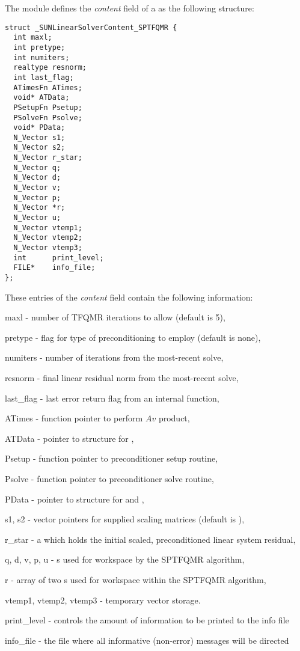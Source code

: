 The {\sunlinsolsptfqmr} module defines the \textit{content} field of a
 as the following structure:
\begin{verbatim}
struct _SUNLinearSolverContent_SPTFQMR {
  int maxl;
  int pretype;
  int numiters;
  realtype resnorm;
  int last_flag;
  ATimesFn ATimes;
  void* ATData;
  PSetupFn Psetup;
  PSolveFn Psolve;
  void* PData;
  N_Vector s1;
  N_Vector s2;
  N_Vector r_star;
  N_Vector q;
  N_Vector d;
  N_Vector v;
  N_Vector p;
  N_Vector *r;
  N_Vector u;
  N_Vector vtemp1;
  N_Vector vtemp2;
  N_Vector vtemp3;
  int      print_level;
  FILE*    info_file;
};
\end{verbatim}
These entries of the \emph{content} field contain the following
information:
\begin{args}
  \item[maxl] - number of TFQMR iterations to allow (default is 5),
  \item[pretype] - flag for type of preconditioning to employ
    (default is none),
  \item[numiters] - number of iterations from the most-recent solve,
  \item[resnorm] - final linear residual norm from the most-recent solve,
  \item[last\_flag] - last error return flag from an internal function,
  \item[ATimes] - function pointer to perform $Av$ product,
  \item[ATData] - pointer to structure for ,
  \item[Psetup] - function pointer to preconditioner setup routine,
  \item[Psolve] - function pointer to preconditioner solve routine,
  \item[PData] - pointer to structure for  and ,
  \item[s1, s2] - vector pointers for supplied scaling matrices
    (default is ),
  \item[r\_star] - a {\nvector} which holds the initial scaled,
    preconditioned linear system residual,
  \item[q, d, v, p, u] - {\nvector}s used for workspace by the SPTFQMR
    algorithm,
  \item [r] - array of two {\nvector}s used for workspace within the
    SPTFQMR algorithm,
  \item[vtemp1, vtemp2, vtemp3] - temporary vector storage.
  \item[print\_level] - controls the amount of information to be printed to the info file
  \item[info\_file]   - the file where all informative (non-error) messages will be directed
\end{args}

